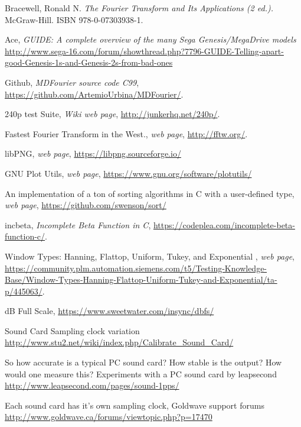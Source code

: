 \documentclass[10pt,a4paper]{report}
\begin{document}
\begin{thebibliography}{9}
	Bracewell, Ronald N. 
	\textit{The Fourier Transform and Its Applications (2 ed.).}
	McGraw-Hill. ISBN 978-0-07303938-1.
	
	Ace, \textit{GUIDE: A complete overview of the many Sega Genesis/MegaDrive models}
	\url{http://www.sega-16.com/forum/showthread.php?7796-GUIDE-Telling-apart-good-Genesis-1s-and-Genesis-2s-from-bad-ones}
	
	Github,
	\textit{MDFourier source code C99},
	\url{https://github.com/ArtemioUrbina/MDFourier/}.
	
	240p test Suite,
	\textit{Wiki web page},
	\url{http://junkerhq.net/240p/}.
	
	Fastest Fourier Transform in the West.,
	\textit{web page},
	\url{http://fftw.org/}.
	
	libPNG,
	\textit{web page},
	\url{https://libpng.sourceforge.io/}
	
	GNU Plot Utils,
	\textit{web page},
	\url{https://www.gnu.org/software/plotutils/}
	
	An implementation of a ton of sorting algorithms in C with a user-defined type,
	\textit{web page},
	\url{https://github.com/swenson/sort/}
	
	incbeta, 
	\textit{Incomplete Beta Function in C},
	\url{https://codeplea.com/incomplete-beta-function-c/}.
	
	Window Types: Hanning, Flattop, Uniform, Tukey, and Exponential ,
	\textit{web page},
	\url{https://community.plm.automation.siemens.com/t5/Testing-Knowledge-Base/Window-Types-Hanning-Flattop-Uniform-Tukey-and-Exponential/ta-p/445063/}.
	
	dB Full Scale, 
	\url{https://www.sweetwater.com/insync/dbfs/}
	
	Sound Card Sampling clock variation
	\url{http://www.stu2.net/wiki/index.php/Calibrate_Sound_Card/}
	
	So how accurate is a typical PC sound card? How stable is the output? How would one measure this?
	Experiments with a PC sound card by leapsecond
	\url{http://www.leapsecond.com/pages/sound-1pps/}
	
	Each sound card has it's own sampling clock, Goldwave support forums
	\url{http://www.goldwave.ca/forums/viewtopic.php?p=17470}
	

\end{thebibliography}
\end{document}
